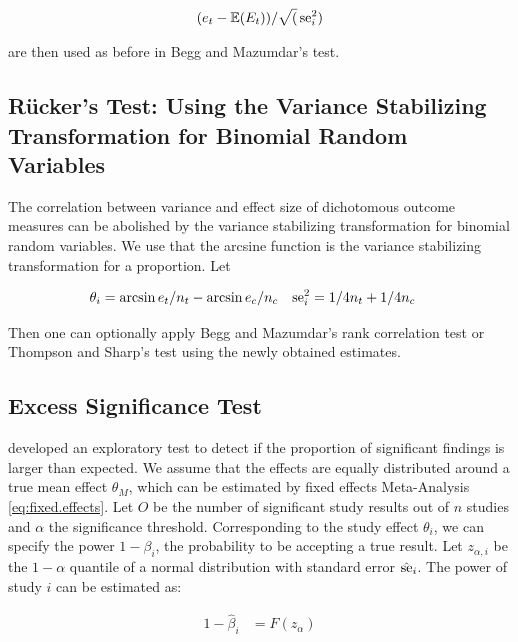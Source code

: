 \documentclass[11pt,a4paper,twoside]{book}\usepackage[]{graphicx}\usepackage[]{color}
\begin{document}
\begin{align}
(e_t - \mathbb{E}(E_t))/\sqrt(\operatorname{se}_i^2)
\end{align}

are then used as before in Begg and Mazumdar's test.

\subsection{R\"ucker's Test: Using the Variance Stabilizing Transformation for Binomial Random Variables} \label{sec:Rucker}
The correlation between variance and effect size of dichotomous outcome measures can be abolished by the variance stabilizing transformation for binomial random variables. We use that the arcsine function is the variance stabilizing transformation for a proportion. Let

\begin{align}
\theta_i &= \arcsin{e_t/n_t} - \arcsin{e_c/n_c} \nonumber &
\operatorname{se}_i^2 &= 1/4n_t + 1/4n_c \nonumber
\end{align}

Then one can optionally apply Begg and Mazumdar's rank correlation test or Thompson and Sharp's test using the newly obtained estimates.


\subsection{Excess Significance Test} \label{sec:excess.significance}
\citet{excess.significance} developed an exploratory test to detect if the proportion of significant findings is larger than expected. 
We assume that the effects are equally distributed around a true mean effect $\theta_M$, which can be estimated by fixed effects Meta-Analysis \eqref{eq:fixed.effects}. Let $O$ be the number of significant study results out of $n$ studies and $\alpha$ the significance threshold. Corresponding to the study effect $\theta_i$, we can specify the power $1 - \beta_i$, the probability to be accepting a true result. Let $z_{\alpha,i}$ be the $1-\alpha$ quantile of a normal distribution with standard error $\hat{\operatorname{se}}_i$. The power of study $i$ can be estimated as:

\begin{align}
1 - \hat{\beta}_i &= F(z_\alpha) 
\end{align}
\end{document}
